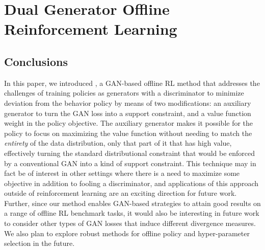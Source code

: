 \chapter{Dual Generator Offline Reinforcement Learning}















\section{Conclusions}

In this paper, we introduced \name{}, a GAN-based offline RL method that addresses the challenges of training policies as generators with a discriminator to minimize deviation from the behavior policy by means of two modifications: an auxiliary generator to turn the GAN loss into a support constraint, and a value function weight in the policy objective. The auxiliary generator makes it possible for the policy to focus on maximizing the value function without needing to match the \emph{entirety} of the data distribution, only that part of it that has high value, effectively turning the standard distributional constraint that would be enforced by a conventional GAN into a kind of support constraint. This technique may in fact be of interest in other settings where there is a need to maximize some objective in addition to fooling a discriminator, and applications of this approach outside of reinforcement learning are an exciting direction for future work. Further, since our method enables GAN-based strategies to attain good results on a range of offline RL benchmark tasks, it would also be interesting in future work to consider other types of GAN losses that induce different divergence measures. We also plan to explore robust methods for offline policy and hyper-parameter selection in the future.

